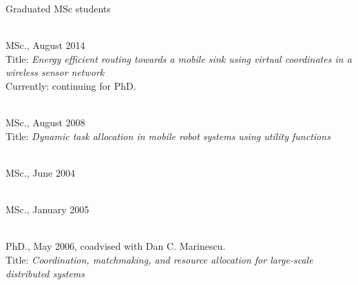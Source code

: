 \begin{category}{Graduated MSc students}

\\
MSc., August 2014\\
Title: {\em Energy efficient routing towards a mobile sink using virtual coordinates in a wireless sensor network}\\
Currently: continuing for PhD.

\\
MSc., August 2008\\
Title: {\em Dynamic task allocation in mobile robot systems using utility
functions}

\\
MSc., June 2004

\\
MSc., January 2005

 \\
PhD., May 2006, coadvised with Dan C. Marinescu.\\
Title: {\em Coordination, matchmaking, and resource allocation for
large-scale distributed systems}


\end{category}

